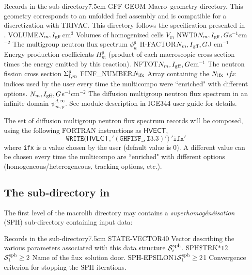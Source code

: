 \begin{DescriptionEnregistrement}{Records in the  sub-directory}{7.5cm}
\DirEnr
  {GFF-GEOM}
  {Macro--geometry directory. This geometry corresponds to an unfolded fuel assembly and is compatible
  for a discretization with TRIVAC. This directory follows the specification presented in .}
\RealEnr
  {VOLUME}{$N_{m},I_{\rm gff}$}{cm$^{3}$}
  {Volumes of homogenized cells $V_{m}$}
\RealEnr
  {NWT0}{$N_{m},I_{\rm gff},G$}{s$^{-1}$cm$^{-2}$}
  {The multigroup neutron flux spectrum $\phi_{w}^{g}$} 
\RealEnr
  {H-FACTOR}{$N_{m},I_{\rm gff},G$}{J cm$^{-1}$}  
  {Energy production coefficients $H_{m}^{g}$ (product of each macroscopic cross section
  times the energy emitted by this reaction).}
\RealEnr
  {NFTOT}{$N_{m},I_{\rm gff},G$}{cm$^{-1}$}
  {The neutron fission cross section $\Sigma_{{\rm f},m}^{g}$}
\IntEnr
  {FINF\_NUMBER}{$N_{\rm ifx}$}
  {Array containing the $N_{\rm ifx}$ $ifx$ indices used by the user every time the multicompo were ``enriched"
  with different options.}
\RealEnr
  {}{$N_{m},I_{\rm gff},G$}{s$^{-1}$cm$^{-2}$} 
  {The diffusion multigroup neutron flux spectrum in an infinite domain $\psi_{m,p}^{d,\infty}$. See
   module description in IGE344 user guide for details.}
\end{DescriptionEnregistrement}

The set of diffusion multigroup neutron flux spectrum records  will be
composed, using the following FORTRAN instructions as $\mathsf{HVECT}$,
  \begin{displaymath}
    \mathtt{WRITE(}\mathsf{HVECT}\mathtt{,'(5HFINF\_,I3.3)')} \ \mathtt{'ifx'}
  \end{displaymath}
where {\tt ifx} is a value chosen by the user (default value is 0). A different value can be chosen every time the multicompo
are ``enriched" with different options (homogeneous/heterogeneous, tracking options, etc.).

\subsection{The  sub-directory in }\label{sect:macroSPH}

The first level of the macrolib directory may contains a {\sl superhomog\'en\'eisation} (SPH) sub-directory 
containing input data:

\begin{DescriptionEnregistrement}{Records in the  sub-directory}{7.5cm}
\IntEnr
  {STATE-VECTOR}{$40$}
  {Vector describing the various parameters associated with this data structure $\mathcal{S}^{\rm sph}_{i}$.}
\OptCharEnr
  {SPH\$TRK}{$*12$}{$\mathcal{S}^{\rm sph}_{1}\ge 2$}
  {Name of the flux solution door.}
\OptRealEnr
  {SPH-EPSILON}{$1$}{$\mathcal{S}^{\rm sph}_{1}\ge 2$}{1}
  {Convergence criterion for stopping the SPH iterations.}
\end{DescriptionEnregistrement}

